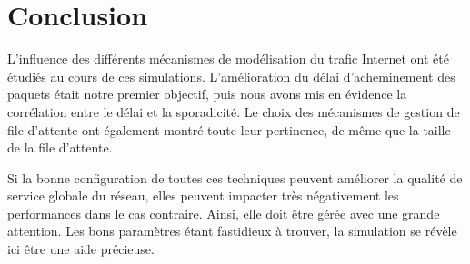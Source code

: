\section*{Conclusion}


L'influence des différents mécanismes de modélisation du trafic Internet ont
été étudiés au cours de ces simulations. L'amélioration du délai
d'acheminement des paquets était notre premier objectif, puis nous avons mis en
évidence la corrélation entre le délai et la sporadicité. Le choix des
mécanismes de gestion de file d'attente ont également montré toute leur
pertinence, de même que la taille de la file d'attente.

Si la bonne configuration de toutes ces techniques peuvent améliorer la qualité
de service globale du réseau, elles peuvent impacter très négativement les
performances dans le cas contraire. Ainsi, elle doit être gérée avec une grande
attention.  Les bons paramètres étant fastidieux à trouver, la simulation se
révèle ici être une aide précieuse.
